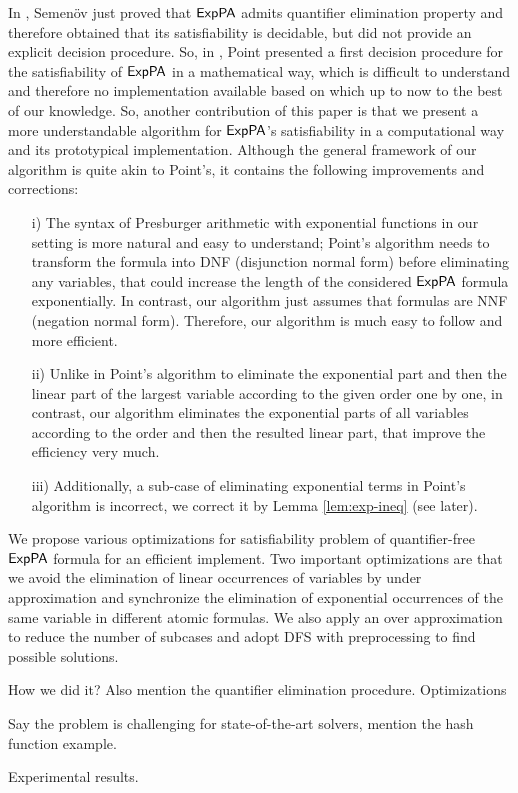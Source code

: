 In \cite{Semenov84}, Semen\"{o}v just proved that ${\sf ExpPA}$ admits quantifier elimination property and 
therefore obtained that its satisfiability is decidable, but  did not provide an explicit decision procedure. So, in  \cite{Point86}, Point presented a first decision procedure for the satisfiability of ${\sf ExpPA}$ in a mathematical way, which is difficult to understand and therefore no implementation available based on which up to now to the best of our knowledge. So, another contribution of this paper is that we present a more understandable algorithm for ${\sf ExpPA}$'s satisfiability in a computational way and its prototypical implementation. Although the general framework of our algorithm is quite akin to Point's,  it contains the following improvements and corrections: 
\begin{itemize}
	\item[i)] The syntax of Presburger arithmetic with exponential functions in our setting is more natural and easy to understand; Point's algorithm needs to transform the formula into DNF (disjunction normal form) before  eliminating any variables, that could increase the length of the considered ${\sf ExpPA}$ formula exponentially. In contrast, our algorithm just assumes that formulas are NNF (negation normal form). Therefore, our algorithm is much easy to follow and more efficient.
\item[ii)] Unlike in Point's algorithm to eliminate the exponential part and then the linear part of the largest variable according to the given order one by one, in contrast, our algorithm eliminates the exponential parts of 
	all variables according to the order and then the resulted linear part, that improve the efficiency very much.
\item[iii)] Additionally, a sub-case of eliminating exponential terms in Point's algorithm is incorrect, we correct it by Lemma \ref{lem:exp-ineq} (see later).
\end{itemize}
 
We propose various optimizations for satisfiability problem of quantifier-free ${\sf ExpPA}$ formula for an efficient implement. Two important optimizations are that we avoid the elimination of linear occurrences of variables by under approximation and synchronize the elimination of exponential occurrences of the same variable in different atomic formulas. We also apply an over approximation to reduce the number of subcases and adopt DFS with preprocessing to find possible solutions. 

How we did it? Also mention the quantifier elimination procedure. Optimizations

Say the problem is challenging for state-of-the-art solvers, mention the hash function example.

Experimental results.